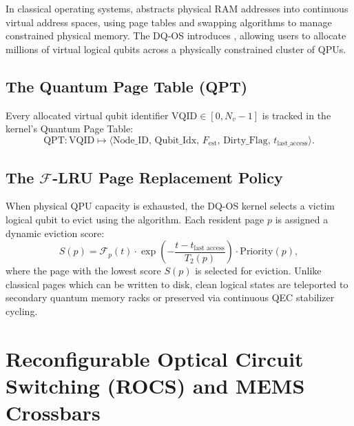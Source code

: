 In classical operating systems,  abstracts physical RAM addresses into continuous virtual address spaces, using page tables and swapping algorithms to manage constrained physical memory. The DQ-OS introduces , allowing users to allocate millions of virtual logical qubits across a physically constrained cluster of QPUs.

\subsection{The Quantum Page Table (QPT)}
Every allocated virtual qubit identifier $\text{VQID} \in [0, N_v-1]$ is tracked in the kernel's Quantum Page Table:
\begin{equation}
    \text{QPT}: \text{VQID} \mapsto \big\langle \text{Node\_ID}, \, \text{Qubit\_Idx}, \, F_{\text{est}}, \, \text{Dirty\_Flag}, \, t_{\text{last\_access}} \big\rangle.
\end{equation}

\subsection{The $\mathcal{F}$-LRU Page Replacement Policy}
When physical QPU capacity is exhausted, the DQ-OS kernel selects a victim logical qubit to evict using the  algorithm. Each resident page $p$ is assigned a dynamic eviction score:
\begin{equation}
    S(p) = \mathcal{F}_p(t) \cdot \exp\left( -\frac{t - t_{\text{last access}}}{T_2(p)} \right) \cdot \text{Priority}(p),
    \label{eq:f_lru_scoring_expanded}
\end{equation}
where the page with the lowest score $S(p)$ is selected for eviction. Unlike classical pages which can be written to disk, clean logical states are teleported to secondary quantum memory racks or preserved via continuous QEC stabilizer cycling.


\section{Reconfigurable Optical Circuit Switching (ROCS) and MEMS Crossbars}
\label{sec:mems_switching}

